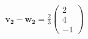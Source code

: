 \documentclass[preview]{standalone}
\begin{document}
\begin{align*}
\mathbf{v_2}    -    \mathbf{w_2}    =\frac{2}{3}\begin{pmatrix} 2 \\ 4 \\ -1 \end{pmatrix}
\end{align*}
\end{document}
